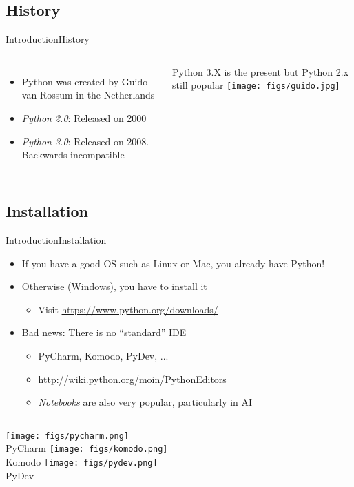 \documentclass[10pt,compress]{beamer} %
\begin{document}
\subsection{History}
\begin{frame}{Introduction}{History}
    \begin{columns}
			\begin{itemize}
				\item Python was created by Guido van Rossum in the Netherlands
				\item \textit{Python 2.0}: Released on 2000
				\item \textit{Python 3.0}: Released on 2008. Backwards-incompatible
			\end{itemize}
			\bigskip
		\centering Python 3.X is the present but Python 2.x still popular
		\centering \texttt{[image: figs/guido.jpg]}
	\end{columns}
\end{frame}

\subsection{Installation}
\begin{frame}{Introduction}{Installation}
\vspace{-0,3cm}
	\begin{itemize}
		\item If you have a good OS such as Linux or Mac, you already have Python!
		\item Otherwise (Windows), you have to install it
			\begin{itemize}
			\item Visit \url{https://www.python.org/downloads/}
			\end{itemize}
		\item Bad news: There is no ``standard'' IDE
			\begin{itemize}
			\item PyCharm, Komodo, PyDev, ...
			\item \url{http://wiki.python.org/moin/PythonEditors}
            \item \textit{Notebooks} are also very popular, particularly in AI
			\end{itemize}
	\end{itemize}
    \begin{columns}
		\texttt{[image: figs/pycharm.png]}\\\centering PyCharm
		\texttt{[image: figs/komodo.png]}\\\centering Komodo
		\texttt{[image: figs/pydev.png]}\\\centering PyDev
	\end{columns}
\end{frame}
\end{document}
